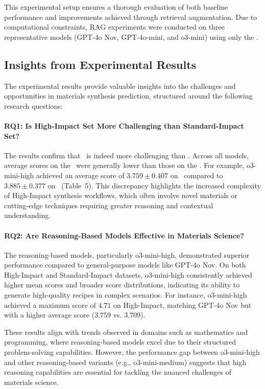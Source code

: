 This experimental setup ensures a thorough evaluation of both baseline performance and improvements achieved through retrieval augmentation. Due to computational constraints, RAG experiments were conducted on three representative models (GPT-4o Nov, GPT-4o-mini, and o3-mini) using only the \testhi.

\subsection{Insights from Experimental Results}
\label{subsec:insights}


The experimental results provide valuable insights into the challenges and opportunities in materials synthesis prediction, structured around the following research questions:



\paragraph*{RQ1: Is High-Impact Set More Challenging than Standard-Impact Set?}
The results confirm that \testhi~is indeed more challenging than \testsi. Across all models, average scores on the \testhi~were generally lower than those on the \testsi. For example, o3-mini-high achieved an average score of \(3.759 \pm 0.407\) on \testhi~compared to \(3.885 \pm 0.377\) on \testsi~(Table~5). This discrepancy highlights the increased complexity of High-Impact synthesis workflows, which often involve novel materials or cutting-edge techniques requiring greater reasoning and contextual understanding.

\paragraph*{RQ2: Are Reasoning-Based Models Effective in Materials Science?}
The reasoning-based models, particularly o3-mini-high, demonstrated superior performance compared to general-purpose models like GPT-4o Nov. On both High-Impact and Standard-Impact datasets, o3-mini-high consistently achieved higher mean scores and broader score distributions, indicating its ability to generate high-quality recipes in complex scenarios. For instance, o3-mini-high achieved a maximum score of \(4.71\) on High-Impact, matching GPT-4o Nov but with a higher average score (\(3.759\) vs. \(3.709\)).

These results align with trends observed in domains such as mathematics and programming, where reasoning-based models excel due to their structured problem-solving capabilities. However, the performance gap between o3-mini-high and other reasoning-based variants (e.g., o3-mini-medium) suggests that high reasoning capabilities are essential for tackling the nuanced challenges of materials science.

